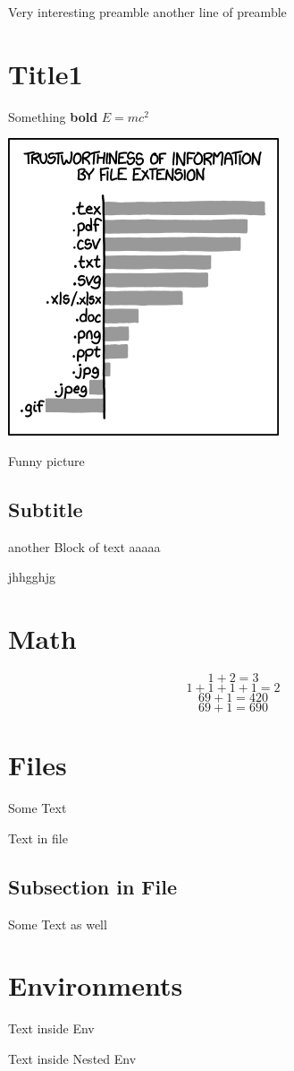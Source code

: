 Very interesting preamble
another line of preamble

\section{Title1}
Something \textbf{bold}
$E = mc^2$

\includegraphics{image.png}
\caption{Funny picture}
\subsection{Subtitle}
another Block of text
aaaaa

jhhgghjg

\section{Math}
\label{math}
$$1+2 = 3$$
\[1+1+1+1=2\]
\begin{displaymath}
69 + 1 = 420
\end{displaymath}
\begin{equation}
69 + 1 = 690
\end{equation}
\section{Files}
Some Text

Text in file

\subsection{Subsection in File}
Some Text as well

\section{Environments}
\begin{Some_Env}
Text inside Env

\begin{Nested_Env}
Text inside Nested Env

\end{Nested_Env}
\end{Some_Env}

